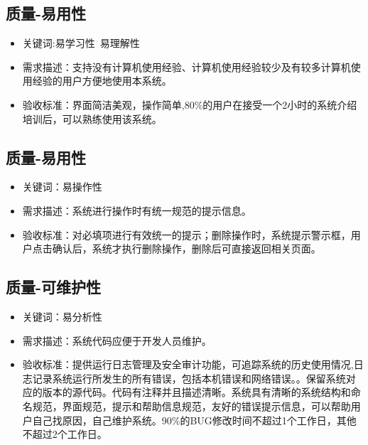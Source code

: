 \documentclass[hyperref, a4paper]{ctexart}
\providecommand{\tightlist}{%
  \setlength{\itemsep}{0pt}\setlength{\parskip}{0pt}}
\begin{document}
\hypertarget{ux8d28ux91cf-ux6613ux7528ux6027}{%
\subsection{质量-易用性}\label{ux8d28ux91cf-ux6613ux7528ux6027}}

\begin{itemize}
\tightlist
\item
  关键词:易学习性~易理解性
\item
  需求描述：支持没有计算机使用经验、计算机使用经验较少及有较多计算机使用经验的用户方便地使用本系统。
\item
  验收标准：界面简洁美观，操作简单,80\%的用户在接受一个2小时的系统介绍培训后，可以熟练使用该系统。
\end{itemize}

\hypertarget{ux8d28ux91cf-ux6613ux7528ux6027-1}{%
\subsection{质量-易用性}\label{ux8d28ux91cf-ux6613ux7528ux6027-1}}

\begin{itemize}
\tightlist
\item
  关键词：易操作性
\item
  需求描述：系统进行操作时有统一规范的提示信息。
\item
  验收标准：对必填项进行有效统一的提示；删除操作时，系统提示警示框，用户点击确认后，系统才执行删除操作，删除后可直接返回相关页面。
\end{itemize}

\hypertarget{ux8d28ux91cf-ux53efux7ef4ux62a4ux6027}{%
\subsection{质量-可维护性}\label{ux8d28ux91cf-ux53efux7ef4ux62a4ux6027}}

\begin{itemize}
\tightlist
\item
  关键词：易分析性
\item
  需求描述：系统代码应便于开发人员维护。
\item
  验收标准：提供运行日志管理及安全审计功能，可追踪系统的历史使用情况,日志记录系统运行所发生的所有错误，包括本机错误和网络错误。。保留系统对应的版本的源代码。代码有注释并且描述清晰。系统具有清晰的系统结构和命名规范，界面规范，提示和帮助信息规范，友好的错误提示信息，可以帮助用户自己找原因，自己维护系统。90\%的BUG修改时间不超过1个工作日，其他不超过2个工作日。
\end{itemize}
\end{document}
